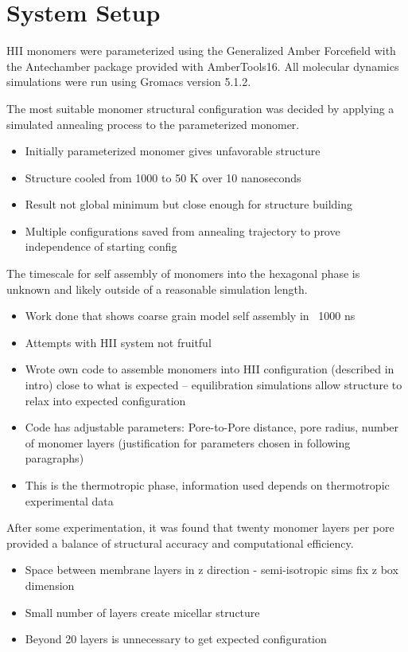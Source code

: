 \documentclass{article}
\begin{document}
	\section{System Setup}
	
	HII monomers were parameterized using the Generalized Amber Forcefield with the Antechamber package provided with AmberTools16. All molecular dynamics simulations were run using Gromacs version 5.1.2.
	
	The most suitable monomer structural configuration was decided by applying a simulated annealing process to the parameterized monomer. 
	\begin{itemize}
		\item Initially parameterized monomer gives unfavorable structure
		\item Structure cooled from 1000 to 50 K over 10 nanoseconds
		\item Result not global minimum but close enough for structure building
		\item Multiple configurations saved from annealing trajectory to prove independence of starting config
	\end{itemize}
	
	The timescale for self assembly of monomers into the hexagonal phase is unknown and likely outside of a reasonable simulation length. 
	\begin{itemize}
		\item Work done that shows coarse grain model self assembly in ~1000 ns
		\item Attempts with HII system not fruitful
		\item Wrote own code to assemble monomers into HII configuration (described in intro) close to what is expected -- equilibration simulations allow structure to relax into expected configuration 
		\item Code has adjustable parameters: Pore-to-Pore distance, pore radius, number of monomer layers (justification for parameters chosen in following paragraphs)
		\item This is the thermotropic phase, information used depends on thermotropic experimental data
	\end{itemize}
	
	After some experimentation, it was found that twenty monomer layers per pore provided a balance of structural accuracy and computational efficiency. 
	\begin{itemize}
		\item Space between membrane layers in z direction - semi-isotropic sims fix z box dimension
		\item Small number of layers create micellar structure
		\item Beyond 20 layers is unnecessary to get expected configuration
	\end{itemize}
	
\end{document}
